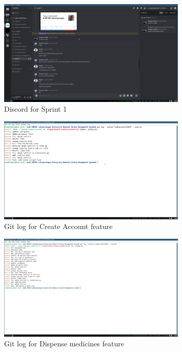 \documentclass[a4paper,12pt]{article}
\begin{document}
\begin{figure}[H]
    \centering
    \includegraphics[width=0.8\textwidth]{images/discord_sprint1.png}
    \caption{Discord for Sprint 1}
    \label{fig:discordsprint1}
\end{figure}


\begin{figure}[H]
    \centering
    \includegraphics[width=0.8\textwidth]{images/git_sprint1.png}
    \caption{Git log for Create Account feature}
    \label{fig:gitlogcreateaccount}
\end{figure}


\begin{figure}[H]
    \centering
    \includegraphics[width=0.8\textwidth]{images/git_sprint1_1.png}
    \caption{Git log for Dispense medicines feature}
    \label{fig:gitlogdispensemedicine}
\end{figure}
\end{document}
